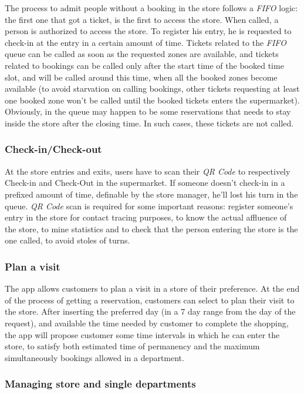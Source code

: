 \documentclass{article}
\begin{document}
		The process to admit people without a booking in the store follows a \emph{FIFO} logic: the first one that got a ticket, is the first to access the store. When called, a person is authorized to access the store. To register his entry, he is requested to check-in at the entry in a certain amount of time. Tickets related to the \emph{FIFO} queue can be called as soon as the requested zones are available, and tickets related to bookings can be called only after the start time of the booked time slot, and will be called around this time, when all the booked zones become available (to avoid starvation on calling bookings, other tickets requesting at least one booked zone won't be called until the booked tickets enters the supermarket). Obviously, in the queue may happen to be some reservations that needs to stay inside the store after the closing time. In such cases, these tickets are not called.
		
		\subsubsection{Check-in/Check-out}
		
		At the store entries and exits, users have to scan their \emph{QR Code} to respectively Check-in and Check-Out in the supermarket. If someone doesn't check-in in a prefixed amount of time, definable by the store manager, he'll lost his turn in the queue. \emph{QR Code} scan is required for some important reasons: register someone's entry in the store for contact tracing purposes, to know the actual affluence of the store, to mine statistics and to check that the person entering the store is the one called, to avoid stoles of turns.
		
		\subsubsection{Plan a visit}
		
		The app allows customers to plan a visit in a store of their preference. At the end of the process of getting a reservation, customers can select to plan their visit to the store. After inserting the preferred day (in a 7 day range from the day of the request), and available the time needed by customer to complete the shopping, the app will propose customer some time intervals in which he can enter the store, to satisfy both estimated time of permanency and the maximum simultaneously bookings allowed in a department. 
		
		\subsubsection{Managing store and single departments}
		
\end{document}
